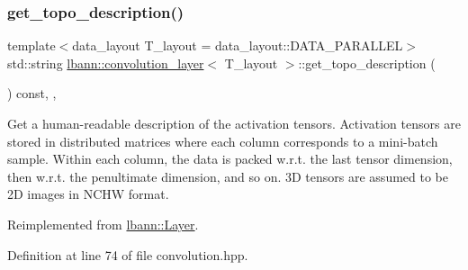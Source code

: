 \subsubsection{\texorpdfstring{get\+\_\+topo\+\_\+description()}{get\_topo\_description()}}
{\footnotesize\ttfamily template$<$data\+\_\+layout T\+\_\+layout = data\+\_\+layout\+::\+D\+A\+T\+A\+\_\+\+P\+A\+R\+A\+L\+L\+EL$>$ \\
std\+::string \hyperlink{classlbann_1_1convolution__layer}{lbann\+::convolution\+\_\+layer}$<$ T\+\_\+layout $>$\+::get\+\_\+topo\+\_\+description (\begin{DoxyParamCaption}{ }\end{DoxyParamCaption}) const\hspace{0.3cm}{\ttfamily [inline]}, {\ttfamily [override]}, {\ttfamily [virtual]}}

Get a human-\/readable description of the activation tensors. Activation tensors are stored in distributed matrices where each column corresponds to a mini-\/batch sample. Within each column, the data is packed w.\+r.\+t. the last tensor dimension, then w.\+r.\+t. the penultimate dimension, and so on. 3D tensors are assumed to be 2D images in N\+C\+HW format. 

Reimplemented from \hyperlink{classlbann_1_1Layer_a147a7f7dcf0027a60f10109439e5dcea}{lbann\+::\+Layer}.



Definition at line 74 of file convolution.\+hpp.


